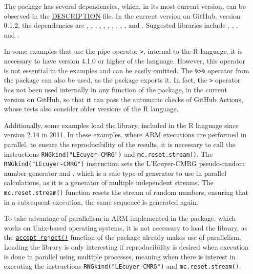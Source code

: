 The  package \citep{AcceptReject} has several dependencies, which, in its most current version, can be observed in the \href{https://github.com/prdm0/AcceptReject/blob/main/DESCRIPTION}{DESCRIPTION} file. In the current version on GitHub, version 0.1.2, the dependencies are  \citep{assertthat},  \citep{cli},  \citep{ggplot2},  \citep{glue},  \citep{numDeriv},  \citep{purrr},  \citep{eddelbuettel2024package},  \citep{eddelbuettel2014rcpparmadillo},  \citep{rlang},  \citep{scales}, and  \citep{scattermore}. Suggested libraries include  \citep{knitr},  \citep{rmarkdown},  \citep{cowplot}, and  \citep{testthat}.

In some examples that use the pipe operator \texttt{\textbar{}\textgreater{}}, internal to the R language, it is necessary to have version 4.1.0 or higher of the language. However, this operator is not essential in the examples and can be easily omitted. The \texttt{\%\textgreater{}\%} operator from the  package \citep{magrittr} can also be used, as the  package exports it. In fact, the \texttt{\textbar{}\textgreater{}} operator has not been used internally in any function of the  package, in the current version on GitHub, so that it can pass the automatic checks of GitHub Actions, whose tests also consider older versions of the R language.

Additionally, some examples load the  library, included in the R language since version 2.14 in 2011. In these examples, where ARM executions are performed in parallel, to ensure the reproducibility of the results, it is necessary to call the instructions \texttt{RNGkind("L\textquotesingle{}Ecuyer-CMRG")} and \texttt{mc.reset.stream()}. The \texttt{RNGkind("L\textquotesingle{}Ecuyer-CMRG")} instruction sets the L'Ecuyer-CMRG pseudo-random number generator \citep{l1999good} and \citep{l2002object}, which is a safe type of generator to use in parallel calculations, as it is a generator of multiple independent streams. The \texttt{mc.reset.stream()} function resets the stream of random numbers, ensuring that in a subsequent execution, the same sequence is generated again.

To take advantage of parallelism in ARM implemented in the  package, which works on Unix-based operating systems, it is not necessary to load the  library, as the \href{https://prdm0.github.io/AcceptReject/reference/accept_reject.html}{\texttt{accept\_reject()}} function of the  package already makes use of parallelism. Loading the  library is only interesting if reproducibility is desired when execution is done in parallel using multiple processes, meaning when there is interest in executing the instructions \texttt{RNGkind("L\textquotesingle{}Ecuyer-CMRG")} and \texttt{mc.reset.stream()}.

